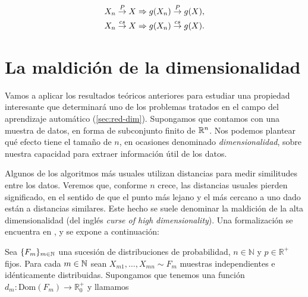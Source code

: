\begin{gather*}
  X_n\overset{P}{\rightarrow} X \Rightarrow g(X_n)\overset{P}{\rightarrow} g(X),\\
  X_n\overset{cs}{\rightarrow} X \Rightarrow g(X_n)\overset{cs}{\rightarrow} g(X).
\end{gather*}

\theoe



\section{La maldición de la
dimensionalidad}\label{sec:dim-curse}

Vamos a aplicar los resultados teóricos anteriores para estudiar una propiedad interesante que determinará uno de los problemas tratados en el campo del aprendizaje automático (\autoref{sec:red-dim}). Supongamos que contamos con una muestra de datos, en forma de subconjunto finito de $\mathbb{R}^{n}$. Nos podemos plantear qué efecto tiene el tamaño de $n$, en ocasiones denominado \emph{dimensionalidad}, sobre nuestra capacidad para extraer información útil de los datos. 

Algunos de los algoritmos más usuales utilizan distancias para medir similitudes entre los datos. Veremos que, conforme $n$ crece, las distancias usuales pierden significado, en el
sentido de que el punto más lejano y el más cercano a uno dado están a
distancias similares. Este hecho se suele denominar la maldición de la
alta dimensionalidad (del inglés \emph{curse of high dimensionality}). Una
formalización se encuentra en \textcite{beyer1999}, y se expone a
continuación:

\theob
\label{th:dim-curse}
Sea \(\{F_{m}\}_{m\in\mathbb{N}}\) una sucesión de distribuciones de
probabilidad, \(n\in \mathbb N\) y \(p\in\mathbb R^+\) fijos. Para cada
\(m\in\mathbb{N}\) sean \(X_{m1},\dots,X_{mn}\sim F_m\) muestras independientes
e idénticamente distribuidas. Supongamos que tenemos una función
\(d_m:\mathrm{Dom}(F_m)\rightarrow \mathbb R^+_0\) y llamamos

